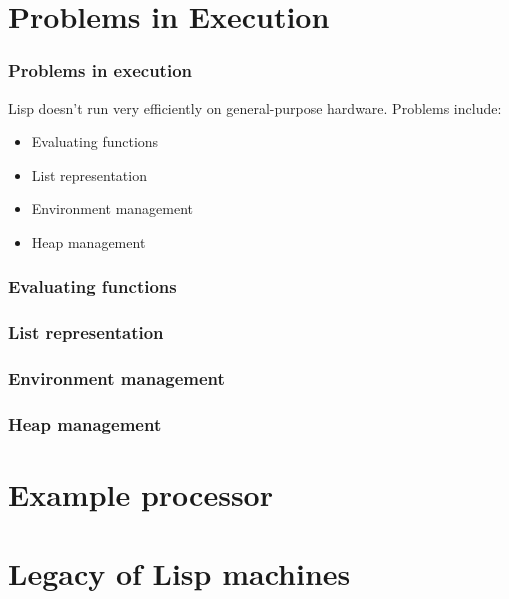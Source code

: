 \documentclass{beamer}
\begin{document}
\section{Problems in Execution}

\begin{frame}
	\frametitle{Problems in execution}
	Lisp doesn't run very efficiently on general-purpose hardware. Problems include:
	\newline
	\begin{itemize}
		\item Evaluating functions
		\newline
		\item List representation
		\newline
		\item Environment management
		\newline
		\item Heap management
	\end{itemize}
	
\end{frame}

\begin{frame}
	\frametitle{Evaluating functions}
\end{frame}

\begin{frame}
	\frametitle{List representation}
\end{frame}

\begin{frame}
	\frametitle{Environment management}
\end{frame}

\begin{frame}
	\frametitle{Heap management}
\end{frame}


\section{Example processor}

\section{Legacy of Lisp machines}
\end{document}
